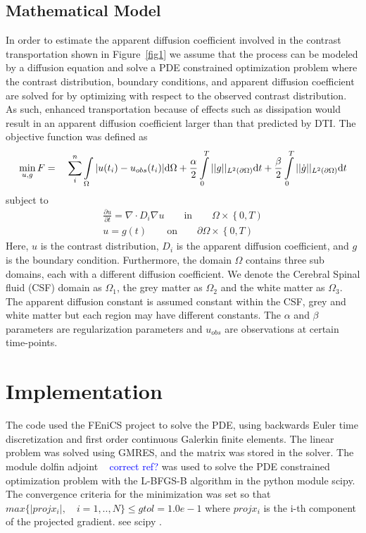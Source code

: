 \documentclass[11pt,a4paper]{article}
\newcommand{\kam}[1]{\textcolor{blue}{#1}}
\begin{document}
\subsection*{Mathematical Model}
In order to estimate the apparent diffusion coefficient involved in the contrast transportation shown 
in Figure~\ref{fig1} we assume that the process can be modeled by a diffusion equation and  
solve a PDE constrained optimization problem where
the contrast distribution, boundary conditions, and apparent
diffusion coefficient are solved for by optimizing with
respect to the observed contrast distribution. As such, enhanced transportation because of effects such as
dissipation would result in an apparent diffusion coefficient larger than that predicted by DTI.  
The objective function was defined as 
\begin{equation}
\min_{u,g} F = \quad \sum\limits_i\sp{n} \int\limits_{\Omega} |u(t_i) - u_{obs}(t_i)| \mathrm{d}\Omega + \frac{\alpha}{2} \int\limits_{0}\sp{T} || g ||_{L\sp{2}(\partial\Omega)} \mathrm{d}t + \frac{\beta}{2} \int\limits_{0}\sp{T} || \dot{g} ||_{L\sp{2}(\partial\Omega)}\mathrm{d}t 
\label{EQ::objf}
\end{equation}
subject to   
\begin{equation}
\begin{aligned}
\frac{\partial u}{\partial t} = \nabla \cdot  D_i \nabla u \qquad \text{in} \qquad \Omega \times \left\lbrace 0 , T \right)  \\
u=g(t) \qquad \text{on} \qquad \partial\Omega  \times \left\lbrace 0 , T \right) 
\end{aligned}
\label{Eq::PDE}
\end{equation}
Here, $u$ is the contrast distribution, $D_i$ is the apparent diffusion 
coefficient, and $g$ is the boundary condition. Furthermore,  
the domain $\Omega$ contains three sub domains, each with a different diffusion coefficient. We denote the Cerebral Spinal fluid (CSF) domain as $\Omega_1$, the grey matter as $\Omega_2$ and the white matter as $\Omega_3$. The apparent
diffusion constant is assumed constant within the CSF, grey and 
white matter but each region may have different constants.  
The $\alpha$ and $\beta$ parameters are regularization parameters 
and $u_{obs}$ are observations at certain time-points. 

\section*{Implementation}
The code used the FEniCS project to solve the PDE, using backwards Euler time discretization and first order continuous Galerkin finite elements. The linear problem was solved using GMRES, and the matrix was stored in the solver. 
The module dolfin adjoint ~\cite{farrell2013automated} \kam{correct ref?} was used to solve the PDE constrained optimization problem with the L-BFGS-B algorithm in the python module scipy. The convergence criteria for the minimization was set so that $max\lbrace | proj x_i | , \quad i = 1, .., N \rbrace \leq gtol=1.0e-1$ where $ proj x_i$ is the i-th component of the projected gradient. {\color{red} see scipy }.  
\end{document}
